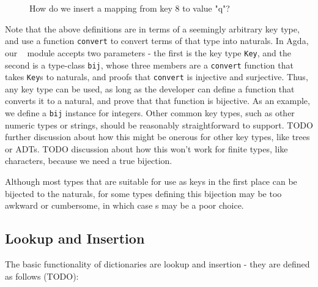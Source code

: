 \begin{figure}[H]
  \centering
  \caption{How do we insert a mapping from key $8$ to value "q"?}
  \label{fig:find-6}
\end{figure}

Note that the above definitions are in terms of a seemingly arbitrary key type,
and use a function \texttt{convert} to convert terms of that type into naturals.
In Agda, our \dd~ module accepts two parameters - the first is the key type \texttt{Key},
and the second is a type-class \texttt{bij}, whose three members are a \texttt{convert}
function that takes \texttt{Key}s to naturals, and proofs that \texttt{convert} is
injective and surjective. Thus, any key type can be used, as long as the developer
can define a function that converts it to a natural, and prove that that function is
bijective. As an example, we define a \texttt{bij} instance for integers. Other common
key types, such as other numeric types or strings, should be reasonably straightforward
to support. TODO further discussion about how this might be onerous for other key types,
like trees or ADTs. TODO discussion about how this won't work for finite types, like
characters, because we need a true bijection.

Although most types that are suitable for use as keys in the first place can be bijected to the
naturals, for some types defining this bijection may be too awkward or cumbersome, in which case {\dd}s may
be a poor choice.

\subsection{Lookup and Insertion}
\label{sec:DD:basics}
The basic functionality of dictionaries are lookup and insertion - they are defined as follows
(TODO):

